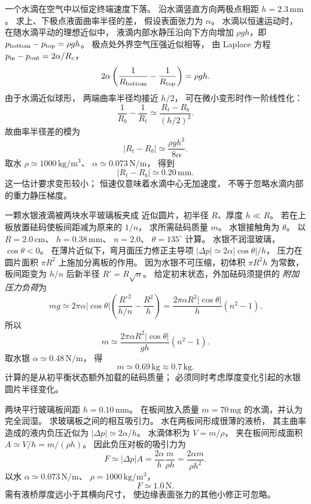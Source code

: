 一个水滴在空气中以恒定终端速度下落。
沿水滴竖直方向两极点相距
$h=2.3\,\mathrm{mm}$。
求上、下极点液面曲率半径的差，
假设表面张力为 $\alpha$。
\exsolution
水滴以恒速运动时，
在随水滴平动的理想近似中，
液滴内部水静压沿向下方向增加
$\rho gh$，即
$p_{\rm bottom}-p_{\rm top}=\rho gh$。
极点处外界空气压强近似相等，
由 Laplace 方程
$p_{\rm in}-p_{\rm out}=2\alpha/R_c$，
\[
2\alpha\left(\frac1{R_{\rm bottom}}
-\frac1{R_{\rm top}}\right)=\rho gh.
\]
由于水滴近似球形，
两端曲率半径均接近 $h/2$，
可在微小变形时作一阶线性化：
\[
\frac1{R_b}-\frac1{R_t}
\simeq\frac{R_t-R_b}{(h/2)^2}.
\]
故曲率半径差的模为
\[
\boxed{|R_t-R_b|\simeq\frac{\rho gh^3}{8\alpha}}.
\]
取水 $\rho\simeq1000\,\mathrm{kg/m^3}$、
$\alpha\simeq0.073\,\mathrm{N/m}$，
得到
\[
\boxed{|R_t-R_b|\simeq0.20\,\mathrm{mm}}.
\]
\excheck 这一估计要求变形较小；
恒速仅意味着水滴中心无加速度，
不等于忽略水滴内部的重力静压梯度。

一颗水银液滴被两块水平玻璃板夹成
近似圆片，初半径 $R$、厚度 $h\ll R$。
若在上板放置砝码使板间距减为原来的 $1/n$，
求所需砝码质量 $m$。
水银接触角为 $\theta$。
以 $R=2.0\,\mathrm{cm}$、
$h=0.38\,\mathrm{mm}$、
$n=2.0$、
$\theta=135^\circ$ 计算。
\exsolution
水银不润湿玻璃，
$\cos\theta<0$。
在薄片近似下，弯月面压力修正主导项
$|\Delta p|\simeq2\alpha|\cos\theta|/h$，
压力在圆片面积 $\pi R^2$ 上施加分离板的作用。
因为水银不可压缩，初体积
$\pi R^2h$ 为常数，
板间距变为 $h/n$ 后新半径
$R'=R\sqrt n$。
给定初末状态，外加砝码须提供的
\emph{附加压力负荷}为
\[
mg\simeq 2\pi\alpha|\cos\theta|
\left(\frac{R'^2}{h/n}-\frac{R^2}{h}\right)
=\frac{2\pi\alpha R^2|\cos\theta|}{h}(n^2-1).
\]
所以
\[
\boxed{m\simeq
\frac{2\pi\alpha R^2|\cos\theta|}{gh}(n^2-1)}.
\]
取水银 $\alpha\simeq0.48\,\mathrm{N/m}$，
得
\[
\boxed{m\simeq0.69\,\mathrm{kg}\approx0.7\,\mathrm{kg}}.
\]
\excheck 计算的是从初平衡状态额外加载的砝码质量；
必须同时考虑厚度变化引起的水银圆片半径变化。

两块平行玻璃板间距
$h=0.10\,\mathrm{mm}$。
在板间放入质量 $m=70\,\mathrm{mg}$
的水滴，并认为完全润湿。
求玻璃板之间的相互吸引力。
\exsolution
水在两板间形成很薄的液桥，
其主曲率造成的液内负压近似为
$|\Delta p|\simeq2\alpha/h$。
水滴体积为 $V=m/\rho$，
夹在板间形成面积
$A\simeq V/h=m/(\rho h)$。
因此负压对板的吸引力为
\[
F\simeq|\Delta p|A
=\frac{2\alpha}{h}\frac{m}{\rho h}
=\boxed{\frac{2\alpha m}{\rho h^2}}.
\]
以水 $\alpha\simeq0.073\,\mathrm{N/m}$、
$\rho=1000\,\mathrm{kg/m^3}$，
\[
\boxed{F\simeq1.0\,\mathrm N}.
\]
\excheck 需有液桥厚度远小于其横向尺寸，
使边缘表面张力的其他小修正可忽略。

